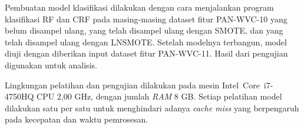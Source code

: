 Pembuatan model klasifikasi dilakukan dengan cara menjalankan program
klasifikasi RF dan CRF pada masing-masing dataset fitur PAN-WVC-10 yang belum
disampel ulang, yang telah disampel ulang dengan SMOTE, dan yang telah disampel
ulang dengan LNSMOTE.
Setelah modelnya terbangun, model diuji dengan diberikan input dataset fitur
PAN-WVC-11. Hasil dari pengujian digunakan untuk analisis.

Lingkungan pelatihan dan pengujian dilakukan pada mesin Intel\textregistered\
 Core\texttrademark \ i7-4750HQ CPU 2,00 GHz, dengan jumlah \textit{RAM} 8
GB. Setiap pelatihan model dilakukan satu per satu untuk menghindari adanya
\textit{cache miss} yang berpengaruh pada kecepatan dan waktu pemrosesan.

